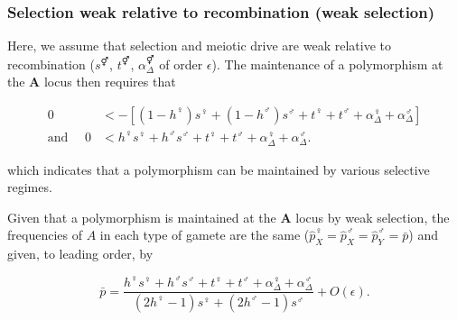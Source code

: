 \documentclass[12pt]{article}
\begin{document}

\subsubsection*{Selection weak relative to recombination (weak selection)}

Here, we assume that selection and meiotic drive are weak relative to recombination ($s^\Hermaphrodite$, $t^\Hermaphrodite$, $\alpha_{\Delta}^\Hermaphrodite$ of order $\epsilon$). 
The maintenance of a polymorphism at the \textbf{A} locus then requires that

\begin{equation}
\begin{split}
0&< - \left[(1-h^\female)s^\female +(1-h^\male) s^\male + t^\female +t^\male + \alpha_{\Delta}^\female+\alpha_{\Delta}^\male\right]\\
%
\text{and }\quad 0&<h^\female s^\female +h^\male s^\male + t^\female +t^\male + \alpha_{\Delta}^\female+\alpha_{\Delta}^\male.
\end{split}
\end{equation}

\noindent
which indicates that a polymorphism can be maintained by various selective regimes. 

Given that a polymorphism is maintained at the \textbf{A} locus by weak selection, the frequencies of $A$ in each type of gamete are the same ($\hat{p}^\female_X=\hat{p}^\male_X=\hat{p}^\male_Y=\bar{p}$) and given, to leading order, by 

\begin{equation}
\bar{p}=\frac{h^\female s^\female + h^\male s^\male +t^\female+t^\male+\alpha_{\Delta}^\female+\alpha_{\Delta}^\male}
{(2h^\female-1)s^\female+(2h^\male-1)s^\male}
+O(\epsilon)
.
\label{eq:pAve}
\end{equation}
\end{document}
